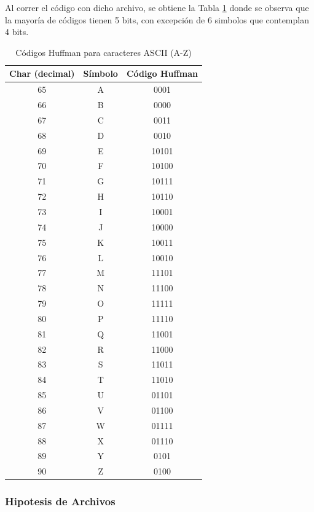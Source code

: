 \documentclass[conference,onecolumn,12pt]{IEEEtran}
\numberwithin{equation}{subsection}
\begin{document}
Al correr el código con dicho archivo, se obtiene la Tabla \ref{tab:huffman_abc} donde se observa que la mayoría de códigos tienen 5 bits, con excepción de 6 simbolos que contemplan 4 bits.

\begin{table}[h!]
    \centering
    \caption{Códigos Huffman para caracteres ASCII (A-Z)}
    \label{tab:huffman_abc}
    \begin{tabular}{ccc}
    \toprule
    \textbf{Char (decimal)} & \textbf{Símbolo} & \textbf{Código Huffman} \\
    \midrule
    65 & A & 0001 \\
    66 & B & 0000 \\
    67 & C & 0011 \\
    68 & D & 0010 \\
    69 & E & 10101 \\
    70 & F & 10100 \\
    71 & G & 10111 \\
    72 & H & 10110 \\
    73 & I & 10001 \\
    74 & J & 10000 \\
    75 & K & 10011 \\
    76 & L & 10010 \\
    77 & M & 11101 \\
    78 & N & 11100 \\
    79 & O & 11111 \\
    80 & P & 11110 \\
    81 & Q & 11001 \\
    82 & R & 11000 \\
    83 & S & 11011 \\
    84 & T & 11010 \\
    85 & U & 01101 \\
    86 & V & 01100 \\
    87 & W & 01111 \\
    88 & X & 01110 \\
    89 & Y & 0101 \\
    90 & Z & 0100 \\
    \bottomrule
    \end{tabular}
\end{table}

\subsubsection{Hipotesis de Archivos}
\hfill\break 
\end{document}
